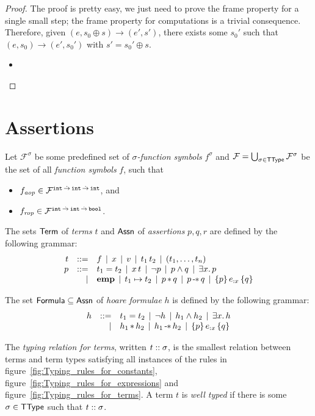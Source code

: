 \documentclass[12pt,a4paper]{article}
\newcommand{\aop}{\nstyle{aop}}
\newcommand{\rop}{\nstyle{rop}}
\newcommand{\emp}{\ensuremath{\mathbf{emp}}}
\begin{document}
\begin{proof}
  The proof is pretty easy, we just need to prove the frame property for a single small step; the frame property
  for computations is a trivial consequence. Therefore, given $(e,s_0 \oplus s) \to (e',s')$, there exists some
  $s_0'$ such that $(e,s_0) \to (e',s_0')$ with $s' = s_0' \oplus s$.
  \begin{itemize}
  \item[\RN{E-Ref}]
  \end{itemize}
\end{proof}


\section{Assertions}

Let $\mathcal{F}^\sigma$ be some predefined set of {\em $\sigma$-function symbols} $f^\sigma$ and
$\mathcal{F} = \bigcup_{\sigma\in\mathsf{TType}}\mathcal{F}^\sigma$ be the set of all {\em function symbols} $f$, such that
\begin{itemize}
\item $f_\aop \in \mathcal{F}^{\ttarrow{\tint}{\ttarrow{\tint}{\tint}}}$, and
\item $f_\rop \in \mathcal{F}^{\ttarrow{\tint}{\ttarrow{\tint}{\tbool}}}$.
\end{itemize}

\begin{definition}[Assertions]
  The sets $\mathsf{Term}$ of {\em terms} $t$ and $\mathsf{Assn}$ of {\em assertions} $p,q,r$ are defined by the following grammar:
  \[\GRbeg
  t \GRis f \GRmid x \GRmid v \GRmid \app{t_1}{t_2} \GRmid \ttuple{t_1,\ldots,t_n}
  \\
  p \GRis t_1 = t_2 \GRmid \app{x}{t} \GRmid \neg p \GRmid p \wedge q \GRmid \exists x.\,p
  \GRal \emp \GRmid t_1 \mapsto t_2 \GRmid p \sepcon q \GRmid p \sepimp q  \GRmid \triplex{p}{e}{x}{q}
  \GRend\]
\end{definition}

\begin{definition}
  The set $\mathsf{Formula} \subseteq \mathsf{Assn}$ of {\em hoare formulae} $h$ is defined by the following grammar:
  \[\begin{array}{rrlll}
  h & ::= & t_1 = t_2 \,\mid\, \neg h \,\mid\, h_1 \wedge h_2 \,\mid\, \exists x.\,h
  \\ & \mid & h_1 \operatorname{\ast} h_2 \,\mid\, h_1 \operatorname{-\kern-.05em\ast} h_2 \,\mid\, \{p\}\,{e}_{:{x}}\,\{q\}
  \end{array}\]
\end{definition}

\begin{definition}
  The {\em typing relation for terms}, written ${t}\mathrel{::}{\sigma}$, is the smallest relation between terms
  and term types satisfying all instances of the rules in figure~\ref{fig:Typing_rules_for_constants},
  figure~\ref{fig:Typing_rules_for_expressions} and figure~\ref{fig:Typing_rules_for_terms}. A term $t$
  is {\em well typed} if there is some $\sigma\in\mathsf{TType}$ such that ${t}\mathrel{::}{\sigma}$.
\end{definition}
\end{document}
